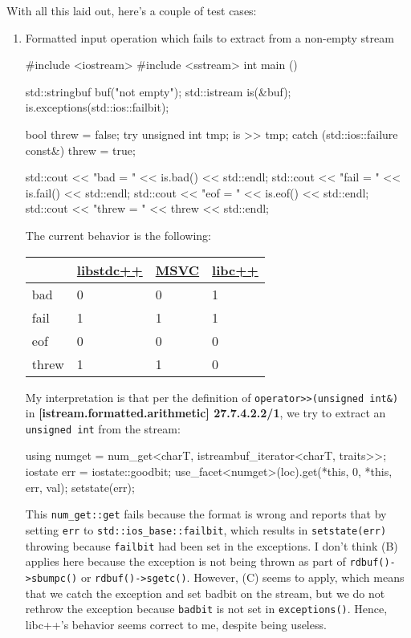 \documentclass{wg21}
\newcommand{\cc}[1]{\texttt{#1}}
\begin{document}
With all this laid out, here's a couple of test cases:

\begin{enumerate}
  \item Formatted input operation which fails to extract from a non-empty stream
  \begin{cpp}
  #include <iostream>
  #include <sstream>
  int main () {
      std::stringbuf buf("not empty");
      std::istream is(&buf);
      is.exceptions(std::ios::failbit);

      bool threw = false;
      try {
          unsigned int tmp{};
          is >> tmp;
      } catch (std::ios::failure const&) {
          threw = true;
      }

      std::cout << "bad = " << is.bad() << std::endl;
      std::cout << "fail = " << is.fail() << std::endl;
      std::cout << "eof = " << is.eof() << std::endl;
      std::cout << "threw = " << threw << std::endl;
  }
  \end{cpp}

  The current behavior is the following:
  \begin{center}
  \begin{tabular}{| l | l | l | l |}
  \hline
         & \href{https://wandbox.org/permlink/fVgU3C1cZWXwbhAN}{libstdc++}
         & \href{http://rextester.com/CBDQE38523}{MSVC}
         & \href{https://wandbox.org/permlink/7sHlkXB3hBqZZ1Ge}{libc++} \\ \hline
  bad    & 0         & 0    & 1      \\ \hline
  fail   & 1         & 1    & 1      \\ \hline
  eof    & 0         & 0    & 0      \\ \hline
  threw  & 1         & 1    & 0      \\ \hline
  \end{tabular}
  \end{center}

  My interpretation is that per the definition of \cc{operator>>(unsigned int&)} in \textbf{[istream.formatted.arithmetic] 27.7.4.2.2/1}, we try to extract an \cc{unsigned int} from the stream:
  \begin{cpp}
    using numget = num_get<charT, istreambuf_iterator<charT, traits>>;
    iostate err = iostate::goodbit;
    use_facet<numget>(loc).get(*this, 0, *this, err, val);
    setstate(err);
  \end{cpp}
  This \cc{num_get::get} fails because the format is wrong and reports that by setting \cc{err} to \cc{std::ios_base::failbit}, which results in \cc{setstate(err)} throwing because \cc{failbit} had been set in the exceptions. I don't think (B) applies here because the exception is not being thrown as part of \cc{rdbuf()->sbumpc()} or \cc{rdbuf()->sgetc()}. However, (C) seems to apply, which means that we catch the exception and set badbit on the stream, but we do not rethrow the exception because \cc{badbit} is not set in \cc{exceptions()}. Hence, libc++'s behavior seems correct to me, despite being useless.


\end{enumerate}
\end{document}
